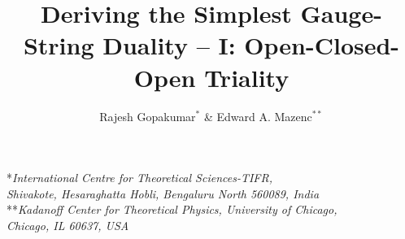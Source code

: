 \documentclass[english]{article}
\begin{document}
\title{\bf{Deriving the Simplest Gauge-String Duality -- I: Open-Closed-Open Triality}} 


\author{Rajesh Gopakumar${^*}$ \& Edward A. Mazenc${^{**}}$}
\date{}


\maketitle

\begin{center}
    \small{*\it{International Centre for Theoretical Sciences-TIFR,\\ Shivakote, Hesaraghatta Hobli, Bengaluru North 560089, India}}\\
\vspace{0.1cm}
  \small{**\it{Kadanoff Center for Theoretical Physics, University of Chicago,\\ Chicago, IL 60637, USA }}
\end{center}

\vspace{2cm}
\end{document}

